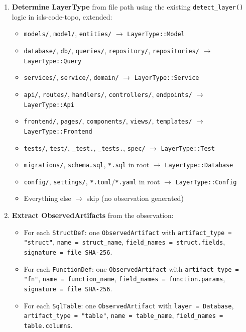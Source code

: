 \documentclass[11pt,a4paper]{article}
\begin{document}
\begin{enumerate}[nosep]
\item \textbf{Determine LayerType} from file path using the existing
      \texttt{detect\_layer()} logic in isls-code-topo, extended:
      \begin{itemize}[nosep]
      \item \texttt{models/}, \texttt{model/}, \texttt{entities/}
            $\to$ \texttt{LayerType::Model}
      \item \texttt{database/}, \texttt{db/}, \texttt{queries/},
            \texttt{repository/}, \texttt{repositories/}
            $\to$ \texttt{LayerType::Query}
      \item \texttt{services/}, \texttt{service/}, \texttt{domain/}
            $\to$ \texttt{LayerType::Service}
      \item \texttt{api/}, \texttt{routes/}, \texttt{handlers/},
            \texttt{controllers/}, \texttt{endpoints/}
            $\to$ \texttt{LayerType::Api}
      \item \texttt{frontend/}, \texttt{pages/}, \texttt{components/},
            \texttt{views/}, \texttt{templates/}
            $\to$ \texttt{LayerType::Frontend}
      \item \texttt{tests/}, \texttt{test/}, \texttt{\_test.},
            \texttt{\_tests.}, \texttt{spec/}
            $\to$ \texttt{LayerType::Test}
      \item \texttt{migrations/}, \texttt{schema.sql}, \texttt{*.sql}
            in root $\to$ \texttt{LayerType::Database}
      \item \texttt{config/}, \texttt{settings/},
            \texttt{*.toml}/\texttt{*.yaml} in root
            $\to$ \texttt{LayerType::Config}
      \item Everything else $\to$ skip (no observation generated)
      \end{itemize}

\item \textbf{Extract ObservedArtifacts} from the observation:
      \begin{itemize}[nosep]
      \item For each \texttt{StructDef}: one \texttt{ObservedArtifact}
            with \texttt{artifact\_type = "struct"},
            \texttt{name = struct\_name},
            \texttt{field\_names = struct.fields},
            \texttt{signature = file SHA-256}.
      \item For each \texttt{FunctionDef}: one \texttt{ObservedArtifact}
            with \texttt{artifact\_type = "fn"},
            \texttt{name = function\_name},
            \texttt{field\_names = function.params},
            \texttt{signature = file SHA-256}.
      \item For each \texttt{SqlTable}: one \texttt{ObservedArtifact}
            with \texttt{layer = Database},
            \texttt{artifact\_type = "table"},
            \texttt{name = table\_name},
            \texttt{field\_names = table.columns}.
      \end{itemize}
\end{enumerate}
\end{document}
